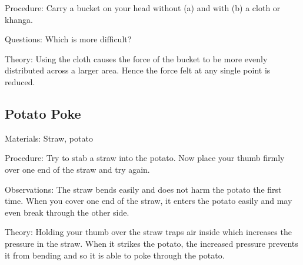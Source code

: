 \begin{multicols}{2}
\begin{description*}
\item[Procedure:]{Carry a bucket on your head without (a) and with (b) a cloth or khanga.}
\item[Questions:]{Which is more difficult?}
\item[Theory:]{Using the cloth causes the force of the bucket to be more evenly distributed across a larger area. Hence the force felt at any single point is reduced.}
\end{description*}

\subsection{Potato Poke}


\begin{description*}
\item[Materials:]{Straw, potato}
\item[Procedure:]{Try to stab a straw into the potato. Now place your thumb firmly over one end of the straw and try again.}
\item[Observations:]{The straw bends easily and does not harm the potato the first time. When you cover one end of the straw, it enters the potato easily and may even break through the other side.}
\item[Theory:]{Holding your thumb over the straw traps air inside which increases the pressure in the straw. When it strikes the potato, the increased pressure prevents it from bending and so it is able to poke through the potato.}
\end{description*}


\end{multicols}
